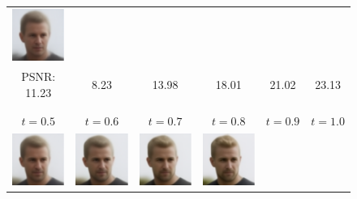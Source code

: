 \documentclass{article} %
\theoremstyle{definition}
\begin{document}
\begin{figure}[htb]
\begin{adjustbox}{max width=1.0\textwidth}
\begin{tabular}{c@{}c@{}c@{}c@{}c@{}c@{}}
            \includegraphics[width=.19\textwidth]{figures/celeba/progression/random_inpainting_pnp_flow_batch11_im1_iter40_pnsr23.13.pdf} \\  
            
             \hspace{-8mm} PSNR: 11.23 
  & \textcolor{red!100!green}{8.23}
  & \textcolor{red!90!green}{13.98}
  & \textcolor{red!80!green}{18.01}
  & \textcolor{red!70!green}{21.02}
  & \textcolor{red!60!green}{23.13}\\
  \\ \\
             $t = 0.5$ & $t = 0.6$ & $t = 0.7$ & $t = 0.8$ & $t = 0.9$ & $t = 1.0$ \\


            \includegraphics[width=.19\textwidth]{figures/celeba/progression/random_inpainting_pnp_flow_batch11_im1_iter50_pnsr25.80.pdf} &

            \includegraphics[width=.19\textwidth]{figures/celeba/progression/random_inpainting_pnp_flow_batch11_im1_iter60_pnsr27.35.pdf} &

            \includegraphics[width=.19\textwidth]{figures/celeba/progression/random_inpainting_pnp_flow_batch11_im1_iter70_pnsr29.23.pdf} &

            \includegraphics[width=.19\textwidth]{figures/celeba/progression/random_inpainting_pnp_flow_batch11_im1_iter80_pnsr31.42.pdf} &


\end{tabular}
\end{adjustbox}
\end{figure}
\end{document}
